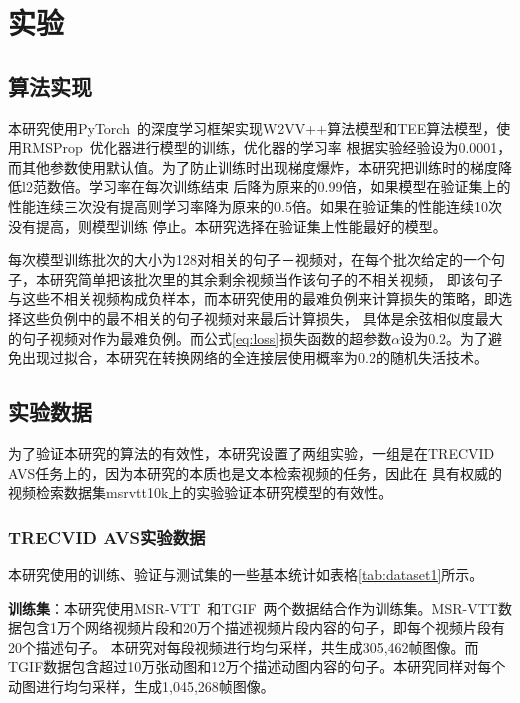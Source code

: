 \chapter{实验}
\section{算法实现}
本研究使用PyTorch~\cite{}的深度学习框架实现W2VV++算法模型和TEE算法模型，使用RMSProp~\cite{}优化器进行模型的训练，优化器的学习率
根据实验经验设为0.0001，而其他参数使用默认值。为了防止训练时出现梯度爆炸，本研究把训练时的梯度降低l2范数倍。学习率在每次训练结束
后降为原来的0.99倍，如果模型在验证集上的性能连续三次没有提高则学习率降为原来的0.5倍。如果在验证集的性能连续10次没有提高，则模型训练
停止。本研究选择在验证集上性能最好的模型。

每次模型训练批次的大小为128对相关的句子－视频对，在每个批次给定的一个句子，本研究简单把该批次里的其余剩余视频当作该句子的不相关视频，
即该句子与这些不相关视频构成负样本，而本研究使用的最难负例来计算损失的策略，即选择这些负例中的最不相关的句子视频对来最后计算损失，
具体是余弦相似度最大的句子视频对作为最难负例。而公式\ref{eq:loss}损失函数的超参数$\alpha$设为0.2。为了避免出现过拟合，本研究在转换网络的全连接层使用概率为0.2的随机失活技术。

\section{实验数据}
为了验证本研究的算法的有效性，本研究设置了两组实验，一组是在TRECVID AVS任务上的，因为本研究的本质也是文本检索视频的任务，因此在
具有权威的视频检索数据集msrvtt10k上的实验验证本研究模型的有效性。

\subsection{TRECVID AVS实验数据}
本研究使用的训练、验证与测试集的一些基本统计如表格\ref{tab:dataset1}所示。

\textbf{训练集}：本研究使用MSR-VTT~\cite{}和TGIF~\cite{}两个数据结合作为训练集。MSR-VTT数据包含1万个网络视频片段和20万个描述视频片段内容的句子，即每个视频片段有20个描述句子。
本研究对每段视频进行均匀采样，共生成305,462帧图像。而TGIF数据包含超过10万张动图和12万个描述动图内容的句子。本研究同样对每个动图进行均匀采样，生成1,045,268帧图像。

